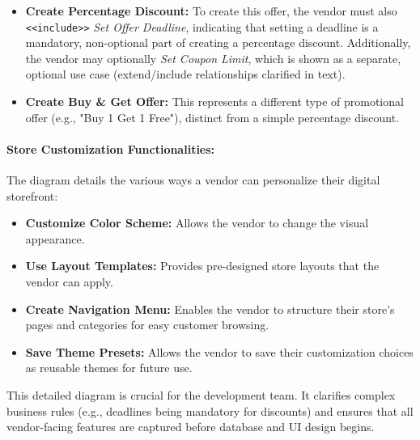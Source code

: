 \begin{itemize}
    \item \textbf{Create Percentage Discount:} To create this offer, the vendor must also \texttt{\textless\textless include\textgreater\textgreater} \textit{Set Offer Deadline}, indicating that setting a deadline is a mandatory, non-optional part of creating a percentage discount. Additionally, the vendor may optionally \textit{Set Coupon Limit}, which is shown as a separate, optional use case (extend/include relationships clarified in text).
    
    \item \textbf{Create Buy \& Get Offer:} This represents a different type of promotional offer (e.g., "Buy 1 Get 1 Free"), distinct from a simple percentage discount.
\end{itemize}

\paragraph{Store Customization Functionalities:}
The diagram details the various ways a vendor can personalize their digital storefront:

\begin{itemize}
    \item \textbf{Customize Color Scheme:} Allows the vendor to change the visual appearance.
    
    \item \textbf{Use Layout Templates:} Provides pre-designed store layouts that the vendor can apply.
    
    \item \textbf{Create Navigation Menu:} Enables the vendor to structure their store's pages and categories for easy customer browsing.
    
    \item \textbf{Save Theme Presets:} Allows the vendor to save their customization choices as reusable themes for future use.
\end{itemize}

\noindent This detailed diagram is crucial for the development team. It clarifies complex business rules (e.g., deadlines being mandatory for discounts) and ensures that all vendor-facing features are captured before database and UI design begins.

